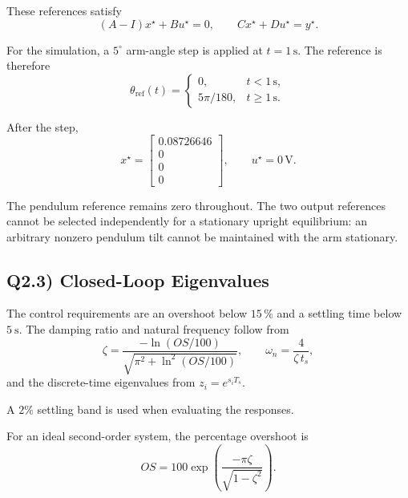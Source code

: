 \documentclass[11pt,a4paper]{article}
\begin{document}
These references satisfy
\begin{equation}
    (A-I)x^\star + Bu^\star = 0,
    \qquad
    Cx^\star + Du^\star = y^\star.
\end{equation}

For the simulation, a $5^\circ$ arm-angle step is applied at
$t=1\,\mathrm{s}$. The reference is therefore
\begin{equation}
\theta_{\mathrm{ref}}(t)=
\begin{cases}
0, & t<1\,\mathrm{s},\\
5\pi/180, & t\geq1\,\mathrm{s}.
\end{cases}
\end{equation}

After the step,
\begin{equation}
    x^\star =
    \begin{bmatrix}
        0.08726646 \\ 0 \\ 0 \\ 0
    \end{bmatrix},
    \qquad
    u^\star=0\,\mathrm{V}.
\end{equation}

The pendulum reference remains zero throughout. The two output references cannot be selected independently for a stationary upright equilibrium: an arbitrary nonzero pendulum tilt cannot be maintained with the arm stationary.

\subsection*{Q2.3) Closed-Loop Eigenvalues}

The control requirements are an overshoot below $15\,\%$ and a settling time
below $5~\mathrm{s}$. The damping ratio and natural frequency follow from
\begin{equation}
  \zeta = \frac{-\ln(OS/100)}{\sqrt{\pi^2+\ln^2(OS/100)}},\qquad
  \omega_n = \frac{4}{\zeta\,t_s},
\end{equation}
and the discrete-time eigenvalues from $z_i = e^{s_i T_s}$.

A $2\%$ settling band is used when evaluating the responses.

For an ideal second-order system, the percentage overshoot is
\begin{equation}
    OS = 100
    \exp\left(
        \frac{-\pi\zeta}{\sqrt{1-\zeta^2}}
    \right).
\end{equation}
\end{document}
